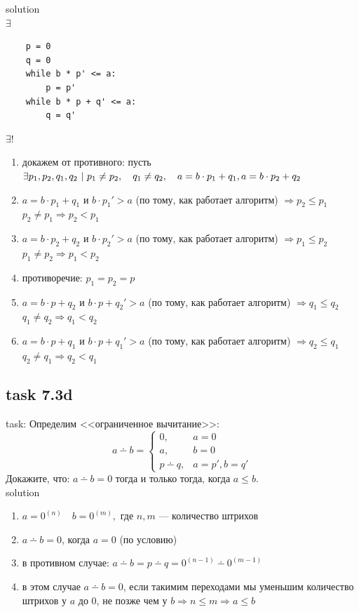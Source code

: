 \documentclass[12pt]{article}
\begin{document}
solution\\

$\exists$
\begin{verbatim}
    p = 0
    q = 0 
    while b * p' <= a:
        p = p'
    while b * p + q' <= a:
        q = q'
\end{verbatim}

$\exists !$
\begin{enumerate}
    \item докажем от противного: пусть $\exists p_1, p_2, q_1, q_2\ |\ p_1\neq p_2,\quad q_1\neq q_2,\quad a = b \cdot p_1 + q_1,\\ a = b \cdot p_2 + q_2$
    \item $a = b \cdot p_1 + q_1$ и $b \cdot p_1'>a$ (по тому, как работает алгоритм) $\Rightarrow p_2 \leq p_1$\\
    $p_2\neq p_1\Rightarrow p_2 < p_1$
    \item $a = b \cdot p_2 + q_2$ и $b \cdot p_2'>a$ (по тому, как работает алгоритм) $\Rightarrow p_1 \leq p_2$\\
    $p_1\neq p_2\Rightarrow p_1 < p_2$
    \item противоречие: $p_1=p_2=p$
    \item $a = b \cdot p + q_2$ и $b \cdot p + q_2'>a$ (по тому, как работает алгоритм) $\Rightarrow q_1 \leq q_2$\\
    $q_1\neq q_2\Rightarrow q_1 < q_2$
    \item $a = b \cdot p + q_1$ и $b \cdot p + q_1'>a$ (по тому, как работает алгоритм) $\Rightarrow q_2 \leq q_1$\\
    $q_2\neq q_1\Rightarrow q_2 < q_1$
\end{enumerate}

\subsection*{task 7.3d}

task: Определим <<ограниченное вычитание>>: $$a \dotminus b = \left\{\begin{array}{ll}0, & a = 0\\a, & b = 0\\p \dotminus q, & a = p', b = q'\end{array}\right.$$
Докажите, что: $a \dotminus b = 0$ тогда и только тогда, когда $a \le b$.\\

solution

\begin{enumerate}
    \item $a = 0^{(n)}\quad b = 0^{(m)},$ где $n, m$ --- количество штрихов
    \item $a \dotminus b = 0$, когда $a=0$ (по условию)
    \item в противном случае: $a \dotminus b = p \dotminus q = 0^{(n - 1)} \dotminus 0^{(m - 1)}$
    \item в этом случае $a \dotminus b = 0$, если такимим переходами мы уменьшим количество штрихов у $a$ до 0, не позже чем у $b \Rightarrow n \le m \Rightarrow a \le b$
\end{enumerate}
\end{document}
